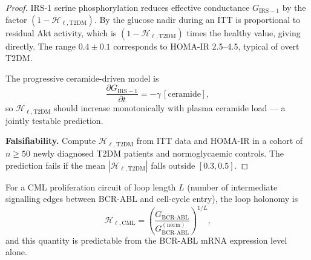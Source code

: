 \begin{proof}
IRS-1 serine phosphorylation reduces effective conductance
$G_{\mathrm{IRS-1}}$ by the factor $(1 - \mathcal{H}_{\ell,\mathrm{T2DM}})$.
By  the glucose nadir during an ITT is proportional
to residual Akt activity, which is $(1 - \mathcal{H}_{\ell,\mathrm{T2DM}})$
times the healthy value, giving  directly.  The
range $0.4 \pm 0.1$ corresponds to HOMA-IR 2.5--4.5, typical of overt T2DM.

The progressive ceramide-driven model is
\begin{equation}
  \frac{\partial G_{\mathrm{IRS-1}}}{\partial t}
  = -\gamma\,[\mathrm{ceramide}],
  \label{eq:ch07-ceramide}
\end{equation}
so $\mathcal{H}_{\ell,\mathrm{T2DM}}$ should increase monotonically with
plasma ceramide load — a jointly testable prediction.

\textbf{Falsifiability.}  Compute $\mathcal{H}_{\ell,\mathrm{T2DM}}$ from ITT
data and HOMA-IR in a cohort of $n \geq 50$ newly diagnosed T2DM patients and
normoglycaemic controls.  The prediction fails if the mean
$|\mathcal{H}_{\ell,\mathrm{T2DM}}|$ falls outside $[0.3, 0.5]$.
\end{proof}

\begin{theorem}
\label{thm:ch07-P3}
For a CML proliferation circuit of loop length $L$ (number of intermediate
signalling edges between BCR-ABL and cell-cycle entry), the loop holonomy is
\begin{equation}
  \mathcal{H}_{\ell,\mathrm{CML}}
  = \left(\frac{G_{\mathrm{BCR\text{-}ABL}}}{G_{\mathrm{BCR\text{-}ABL}}^{(\mathrm{norm})}}\right)^{1/L},
  \label{eq:ch07-P3-holonomy}
\end{equation}
and this quantity is predictable from the BCR-ABL mRNA expression level alone.
\end{theorem}

